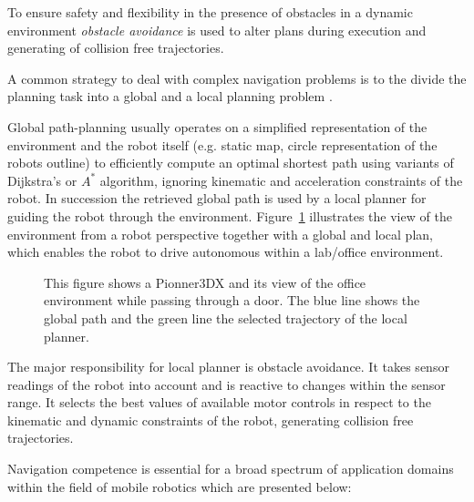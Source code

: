 To ensure safety and flexibility in the presence of obstacles in a dynamic environment \emph{obstacle avoidance} is used to alter plans during execution and generating of collision free trajectories.

A common strategy to deal with complex navigation problems is to the divide the planning task into a global and a local planning problem \cite{LaValle2006}.

Global path-planning usually operates on a simplified representation of the environment and the robot itself (e.g. static map, circle representation of the robots outline) to efficiently compute an optimal shortest path using variants of Dijkstra's \cite{dijkstra1959note} or $A^*$ \cite{DBLP:journals/tssc/HartNR68/Astar} algorithm, ignoring kinematic and acceleration constraints of the robot.
In succession the retrieved global path is used by a local planner for guiding the robot through the environment.
Figure~\ref{fig:fig_pioneer} illustrates the view of the environment from a robot perspective together with a global and local plan, which enables the robot to drive autonomous within a lab/office environment.

\begin{figure}[thpb]
      \centering
      \def\svgwidth{\textwidth}
      
      \caption[Global and local planning.]{This figure shows a Pionner3DX and its view of the office environment while passing through a door. The blue line shows the global path and the green line the selected trajectory of the local planner.}
      \label{fig:fig_pioneer}
\end{figure}

The major responsibility for local planner is obstacle avoidance. It takes sensor readings of the robot into account and is reactive to changes within the sensor range. 
It selects the best values of available motor controls in respect to the kinematic and dynamic constraints of the robot, generating collision free trajectories. 
   
Navigation competence is essential for a broad spectrum of application domains within the field of mobile robotics which are presented below:

